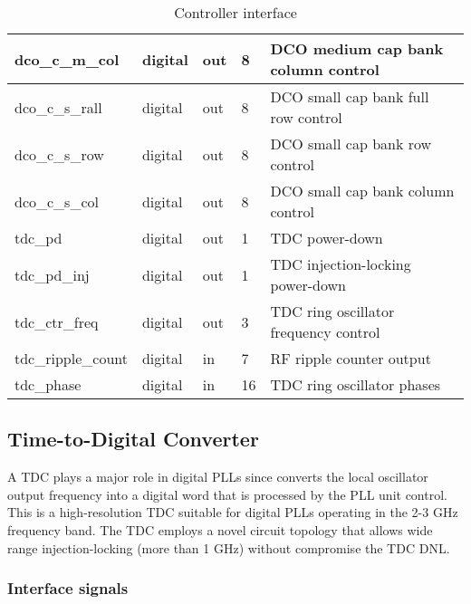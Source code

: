 \begin{table}[!h]
\begin{tabular}{|p{3cm}|p{1.5cm}|p{2cm}|p{1.5cm}|p{7cm}|}
    \hline
    dco\_c\_m\_col & digital & out  & 8 & DCO medium cap bank column control\\
    \hline
     dco\_c\_s\_rall & digital & out  & 8 & DCO small cap bank full row control\\
    \hline
    dco\_c\_s\_row & digital & out  & 8 & DCO small cap bank row control\\
    \hline
    dco\_c\_s\_col & digital & out  & 8 & DCO small cap bank column control\\
    \hline
    tdc\_pd & digital & out  & 1 & TDC power-down\\
    \hline
    tdc\_pd\_inj & digital & out  & 1 & TDC injection-locking power-down\\
    \hline
    tdc\_ctr\_freq & digital & out  & 3 & TDC ring oscillator frequency control\\
    \hline
    tdc\_ripple\_count & digital & in  & 7 & RF ripple counter output\\
    \hline
    tdc\_phase & digital & in  & 16 & TDC ring oscillator phases\\
    \hline
    \end{tabular}
  \caption{Controller interface}
  \label{tab:adpll_ctr_interface}
\end{table}




\subsection{Time-to-Digital Converter}
\label{sec:tdc}
A TDC plays a major role in digital PLLs since converts the local oscillator output frequency into a digital word that is processed by the PLL unit control. This is a high-resolution TDC suitable for digital PLLs operating in the 2-3 GHz frequency band. The TDC employs a novel circuit topology that allows wide range injection-locking (more than 1 GHz) without compromise the TDC DNL.

\subsubsection{Interface signals}


